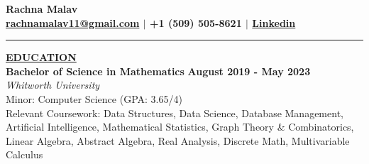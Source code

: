 \documentclass{article}
\begin{document}
\begin{center}
\thispagestyle{empty}
\large \textbf{Rachna Malav \\}
\normalsize \textbf{\href{mailto:rachnamalav11@gmail.com}{rachnamalav11@gmail.com} $\mid$ +1 (509) 505-8621 $\mid$ \href{https://www.linkedin.com/in/rachna-malav/}{Linkedin} \\}
\rule{\textwidth}{1pt}
\end{center}









\noindent \textbf{\underline{EDUCATION}} \\
\textbf{Bachelor of Science in Mathematics} \hfill \textbf{August 2019 - May 2023} \\
\textit{Whitworth University}\\
Minor: Computer Science (GPA: 3.65/4)\\
Relevant Coursework: Data Structures, Data Science, Database Management, Artificial Intelligence, Mathematical Statistics, Graph Theory \& Combinatorics, Linear Algebra, Abstract Algebra, Real Analysis, Discrete Math, Multivariable Calculus\\
\begin{itemize}[noitemsep,nolistsep,leftmargin=*]
\end{itemize}



% 
%
\end{document}
